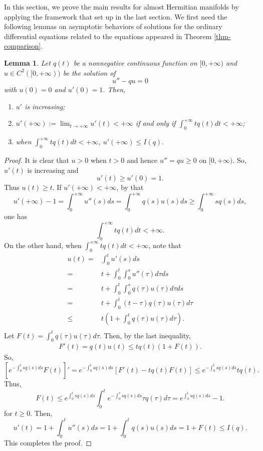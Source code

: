 \documentclass[12pt]{amsart}
\newtheorem{lem}{Lemma}[section]
\theoremstyle{definition}
\theoremstyle{remark}
\numberwithin{equation}{section}
\def\D{\displaystyle}
\begin{document}
In this section, we prove the main results for almost Hermitian manifolds by applying the framework that set up in the last section. We first need the following lemmas on asymptotic behaviors of solutions for the ordinary differential equations related to the equations appeared in Theorem \ref{thm-comparison}.
\begin{lem}\label{lem-second-ODE}
Let $q(t)$ be a nonnegative continuous function on $[0,+\infty)$ and $u\in C^2([0,+\infty))$ be the solution of
$$u''-qu=0$$
with $u(0)=0$ and $u'(0)=1$. Then,
\begin{enumerate}
\item $u'$ is increasing;
\item $u'(+\infty):=\D\lim_{t\to +\infty} u'(t)<+\infty$ if and only if $\D\int_0^{+\infty}tq(t)dt<+\infty$;
\item when $\D\int_0^{+\infty}tq(t)dt<+\infty$, $u'(+\infty)\leq I(q).$
\end{enumerate}
\end{lem}
\begin{proof}
It is clear that $u>0$ when $t>0$ and hence $u''=qu\geq0$ on $[0,+\infty)$. So, $u'(t)$ is increasing and
$$u'(t)\geq u'(0)=1.$$
Thus $u(t)\geq t$. If $u'(+\infty)<+\infty$, by that
\begin{equation}
u'(+\infty)-1=\int_0^{+\infty}u''(s)ds=\int_0^{+\infty}q(s)u(s)ds\geq \int_0^{+\infty}sq(s)ds,
\end{equation}
one has
\begin{equation}
\int_0^{+\infty}tq(t)dt<+\infty.
\end{equation}
On the other hand, when $\int_0^{+\infty}tq(t)dt<+\infty$, note that
\begin{equation}
\begin{split}
u(t)=&\int_0^tu'(s)ds\\
=&t+\int_0^t\int_0^su''(\tau)d\tau ds\\
=&t+\int_0^t\int_0^sq(\tau)u(\tau)d\tau ds\\
=&t+\int_0^t(t-\tau)q(\tau)u(\tau)d\tau \\
\leq&t\left(1+\int_0^tq(\tau)u(\tau)d\tau\right). \\
\end{split}
\end{equation}
Let $F(t)=\int_0^tq(\tau)u(\tau)d\tau$. Then, by the last inequality,
\begin{equation}
\begin{split}
F'(t)=q(t)u(t)\leq tq(t)\left(1+F(t)\right).
\end{split}
\end{equation}
So,
\begin{equation}
\left[e^{-\int_0^ts q(s)ds}F(t)\right]'=e^{-\int_0^ts q(s)ds}[F'(t)-tq(t)F(t)]\leq e^{-\int_0^ts q(s)ds}tq(t).
\end{equation}
Thus,
\begin{equation}
F(t)\leq e^{\int_0^tsq(s)ds}\int_0^te^{-\int_0^\tau s q(s)ds}\tau q(\tau)d\tau=e^{\int_0^tsq(s)ds}-1.
\end{equation}
for $t\geq 0$. Then,
\begin{equation}
u'(t)=1+\int_0^tu''(s)ds=1+\int_0^tq(s)u(s)ds=1+F(t)\leq I(q).
\end{equation}
This completes the proof.
\end{proof}
\end{document}
